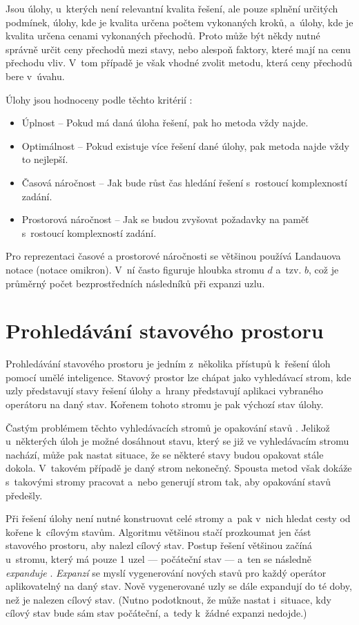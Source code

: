 Jsou úlohy, u~kterých není relevantní kvalita řešení, ale pouze splnění určitých podmínek, úlohy, kde je kvalita určena počtem vykonaných kroků, a~úlohy, kde je kvalita určena cenami vykonaných přechodů. Proto může být někdy nutné správně určit ceny přechodů mezi stavy, nebo alespoň faktory, které mají na cenu přechodu vliv. V~tom případě je však vhodné zvolit metodu, která ceny přechodů bere v~úvahu.

Úlohy jsou hodnoceny podle těchto kritérií \cite{AI_Russel_Norvig}:
\begin{itemize}
    \item Úplnost -- Pokud má daná úloha řešení, pak ho metoda vždy najde.
    \item Optimálnost -- Pokud existuje více řešení dané úlohy, pak metoda najde vždy to nejlepší.
    \item Časová náročnost -- Jak bude růst čas hledání řešení s~rostoucí komplexností zadání.
    \item Prostorová náročnost -- Jak se budou zvyšovat požadavky na paměť s~rostoucí komplexností zadání.
\end{itemize}

Pro reprezentaci časové a prostorové náročnosti se většinou používá Landauova notace (notace omikron). V~ní často figuruje hloubka stromu $d$ a~tzv.  $b$, což je průměrný počet bezprostředních následníků při expanzi uzlu.


\section{Prohledávání stavového prostoru}

Prohledávání stavového prostoru je jedním z~několika přístupů k~řešení úloh pomocí umělé inteligence. Stavový prostor lze chápat jako vyhledávací strom, kde uzly představují stavy řešení úlohy a~hrany představují aplikaci vybraného operátoru na daný stav. Kořenem tohoto stromu je pak výchozí stav úlohy.

Častým problémem těchto vyhledávacích stromů je opakování stavů \cite{AI_Russel_Norvig}. Jelikož u~některých úloh je možné dosáhnout stavu, který se již ve vyhledávacím stromu nachází, může pak nastat situace, že se některé stavy budou opakovat stále dokola. V~takovém případě je daný strom nekonečný. Spousta metod však dokáže s~takovými stromy pracovat a~nebo generují strom tak, aby opakování stavů předešly.

Při řešení úlohy není nutné konstruovat celé stromy a~pak v~nich hledat cesty od kořene k~cílovým stavům. Algoritmu většinou stačí prozkoumat jen část stavového prostoru, aby nalezl cílový stav. Postup řešení většinou začíná u~stromu, který má pouze 1 uzel --- počáteční stav --- a~ten se následně \emph{expanduje} \cite{AI_Russel_Norvig}. \emph{Expanzí} se myslí vygenerování nových stavů pro každý operátor aplikovatelný na daný stav. Nově vygenerované uzly se dále expandují do té doby, než je nalezen cílový stav. (Nutno podotknout, že může nastat i~situace, kdy cílový stav bude sám stav počáteční, a~tedy k~žádné expanzi nedojde.)


